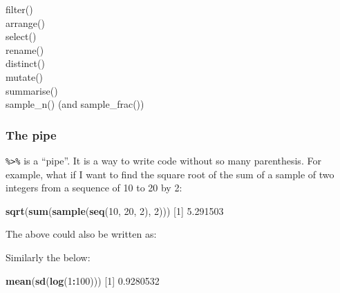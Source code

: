 \documentclass[
]{book}
\newenvironment{Shaded}{\begin{snugshade}}{\end{snugshade}}
\newcommand{\DecValTok}[1]{\textcolor[rgb]{0.00,0.00,0.81}{#1}}
\newcommand{\FloatTok}[1]{\textcolor[rgb]{0.00,0.00,0.81}{#1}}
\newcommand{\KeywordTok}[1]{\textcolor[rgb]{0.13,0.29,0.53}{\textbf{#1}}}
\newcommand{\NormalTok}[1]{#1}
\newcommand{\OperatorTok}[1]{\textcolor[rgb]{0.81,0.36,0.00}{\textbf{#1}}}
\newcommand{\StringTok}[1]{\textcolor[rgb]{0.31,0.60,0.02}{#1}}
\begin{document}
filter()\\
arrange()\\
select()\\
rename()\\
distinct()\\
mutate()\\
summarise()\\
sample\_n() (and sample\_frac())

\hypertarget{the-pipe}{%
\subsubsection{The pipe}\label{the-pipe}}

\texttt{\%\textgreater{}\%} is a ``pipe''. It is a way to write code without so many parenthesis. For example, what if I want to find the square root of the sum of a sample of two integers from a sequence of 10 to 20 by 2:

\begin{Shaded}
\begin{Highlighting}[]
\KeywordTok{sqrt}\NormalTok{(}\KeywordTok{sum}\NormalTok{(}\KeywordTok{sample}\NormalTok{(}\KeywordTok{seq}\NormalTok{(}\DecValTok{10}\NormalTok{, }\DecValTok{20}\NormalTok{, }\DecValTok{2}\NormalTok{), }\DecValTok{2}\NormalTok{)))}
\NormalTok{[}\DecValTok{1}\NormalTok{] }\FloatTok{5.291503}
\end{Highlighting}
\end{Shaded}

The above could also be written as:

\begin{Shaded}
\end{Shaded}

Similarly the below:

\begin{Shaded}
\begin{Highlighting}[]
\KeywordTok{mean}\NormalTok{(}\KeywordTok{sd}\NormalTok{(}\KeywordTok{log}\NormalTok{(}\DecValTok{1}\OperatorTok{:}\DecValTok{100}\NormalTok{)))}
\NormalTok{[}\DecValTok{1}\NormalTok{] }\FloatTok{0.9280532}
\end{Highlighting}
\end{Shaded}
\end{document}
